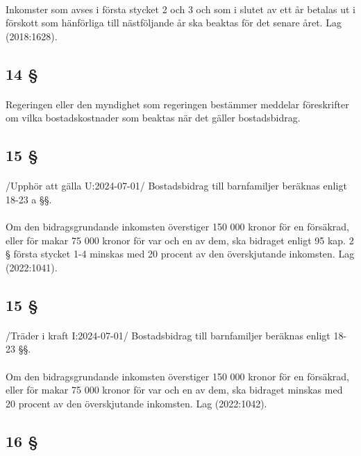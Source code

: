 \documentclass[a4paper,notitlepage,openany,10pt]{book}
\begin{document}
\paragraph*{}
Inkomster som avses i första stycket 2 och 3 och som i slutet av ett år betalas ut i förskott som hänförliga till nästföljande år ska beaktas för det senare året.
Lag (2018:1628).
\subsection*{14 §}
\paragraph*{}
Regeringen eller den myndighet som regeringen bestämmer meddelar föreskrifter om vilka bostadskostnader som beaktas när det gäller bostadsbidrag.
\subsection*{15 §}
\paragraph*{}
/Upphör att gälla U:2024-07-01/
Bostadsbidrag till barnfamiljer beräknas enligt 18-23 a §§.
\paragraph*{}
Om den bidragsgrundande inkomsten överstiger 150 000 kronor för en försäkrad, eller för makar 75 000 kronor för var och en av dem, ska bidraget enligt 95 kap. 2 § första stycket 1-4 minskas med 20 procent av den överskjutande inkomsten.
Lag (2022:1041).
\subsection*{15 §}
\paragraph*{}
/Träder i kraft I:2024-07-01/
Bostadsbidrag till barnfamiljer beräknas enligt 18-23 §§.
\paragraph*{}
Om den bidragsgrundande inkomsten överstiger 150 000 kronor för en försäkrad, eller för makar 75 000 kronor för var och en av dem, ska bidraget minskas med 20 procent av den överskjutande inkomsten.
Lag (2022:1042).
\subsection*{16 §}
\end{document}
